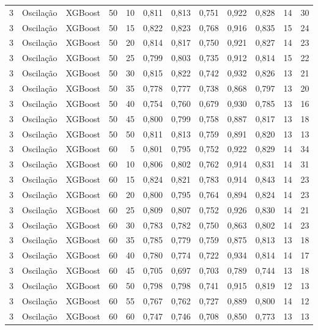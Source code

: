 \begin{longtable}{ccclrrrrrrrr}
3 & Oscilação & XGBoost & 50 & 10 & 0,811 & 0,813 & 0,751 & 0,922 & 0,828 & 14 & 30 \\
3 & Oscilação & XGBoost & 50 & 15 & 0,822 & 0,823 & 0,768 & 0,916 & 0,835 & 15 & 24 \\
3 & Oscilação & XGBoost & 50 & 20 & 0,814 & 0,817 & 0,750 & 0,921 & 0,827 & 14 & 23 \\
3 & Oscilação & XGBoost & 50 & 25 & 0,799 & 0,803 & 0,735 & 0,912 & 0,814 & 15 & 22 \\
3 & Oscilação & XGBoost & 50 & 30 & 0,815 & 0,822 & 0,742 & 0,932 & 0,826 & 13 & 21 \\
3 & Oscilação & XGBoost & 50 & 35 & 0,778 & 0,777 & 0,738 & 0,868 & 0,797 & 13 & 20 \\
3 & Oscilação & XGBoost & 50 & 40 & 0,754 & 0,760 & 0,679 & 0,930 & 0,785 & 13 & 16 \\
3 & Oscilação & XGBoost & 50 & 45 & 0,800 & 0,799 & 0,758 & 0,887 & 0,817 & 13 & 18 \\
3 & Oscilação & XGBoost & 50 & 50 & 0,811 & 0,813 & 0,759 & 0,891 & 0,820 & 13 & 13 \\
3 & Oscilação & XGBoost & 60 & 5 & 0,801 & 0,795 & 0,752 & 0,922 & 0,829 & 14 & 34 \\
3 & Oscilação & XGBoost & 60 & 10 & 0,806 & 0,802 & 0,762 & 0,914 & 0,831 & 14 & 31 \\
3 & Oscilação & XGBoost & 60 & 15 & 0,824 & 0,821 & 0,783 & 0,914 & 0,843 & 14 & 23 \\
3 & Oscilação & XGBoost & 60 & 20 & 0,800 & 0,795 & 0,764 & 0,894 & 0,824 & 14 & 23 \\
3 & Oscilação & XGBoost & 60 & 25 & 0,809 & 0,807 & 0,752 & 0,926 & 0,830 & 14 & 21 \\
3 & Oscilação & XGBoost & 60 & 30 & 0,783 & 0,782 & 0,750 & 0,863 & 0,802 & 14 & 23 \\
3 & Oscilação & XGBoost & 60 & 35 & 0,785 & 0,779 & 0,759 & 0,875 & 0,813 & 13 & 18 \\
3 & Oscilação & XGBoost & 60 & 40 & 0,780 & 0,774 & 0,722 & 0,934 & 0,814 & 14 & 17 \\
3 & Oscilação & XGBoost & 60 & 45 & 0,705 & 0,697 & 0,703 & 0,789 & 0,744 & 13 & 18 \\
3 & Oscilação & XGBoost & 60 & 50 & 0,798 & 0,798 & 0,741 & 0,915 & 0,819 & 12 & 13 \\
3 & Oscilação & XGBoost & 60 & 55 & 0,767 & 0,762 & 0,727 & 0,889 & 0,800 & 14 & 12 \\
3 & Oscilação & XGBoost & 60 & 60 & 0,747 & 0,746 & 0,708 & 0,850 & 0,773 & 13 & 13 \\

\end{longtable}
